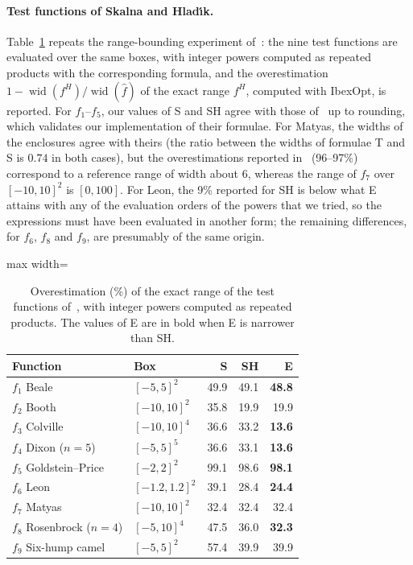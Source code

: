 \documentclass[10pt]{article}
\theoremstyle{definition}
\newcommand{\wid}{\operatorname{wid}}
\begin{document}


\paragraph{Test functions of Skalna and Hlad\'{\i}k.} Table~\ref{tab:sh} repeats the range-bounding experiment of~\cite[Table~3]{skalna2017new}: the nine test functions are evaluated over the same boxes, with integer powers computed as repeated products with the corresponding formula, and the overestimation $1-\wid(f^H)/\wid(\hat f)$ of the exact range $f^H$, computed with IbexOpt, is reported. For $f_1$--$f_5$, our values of S and SH agree with those of~\cite{skalna2017new} up to rounding, which validates our implementation of their formulae. For Matyas, the widths of the enclosures agree with theirs (the ratio between the widths of formulae T and S is $0.74$ in both cases), but the overestimations reported in~\cite{skalna2017new} (96--97\%) correspond to a reference range of width about 6, whereas the range of $f_7$ over $[-10,10]^2$ is $[0,100]$. For Leon, the 9\% reported for SH is below what E attains with any of the evaluation orders of the powers that we tried, so the expressions must have been evaluated in another form; the remaining differences, for $f_6$, $f_8$ and $f_9$, are presumably of the same origin.

\begin{table}[H]
\centering
\caption{Overestimation (\%) of the exact range of the test functions of~\cite{skalna2017new}, with integer powers computed as repeated products. The values of E are in bold when E is narrower than SH.}
\label{tab:sh}
\small
\begin{adjustbox}{max width=\linewidth}\begin{tabular}{llrrr}
\toprule
Function & Box & S & SH & E \\
\midrule
$f_1$ Beale & $[-5,5]^2$ & 49.9 & 49.1 & \textbf{48.8} \\
$f_2$ Booth & $[-10,10]^2$ & 35.8 & 19.9 & 19.9 \\
$f_3$ Colville & $[-10,10]^4$ & 36.6 & 33.2 & \textbf{13.6} \\
$f_4$ Dixon ($n=5$) & $[-5,5]^5$ & 36.6 & 33.1 & \textbf{13.6} \\
$f_5$ Goldstein--Price & $[-2,2]^2$ & 99.1 & 98.6 & \textbf{98.1} \\
$f_6$ Leon & $[-1.2,1.2]^2$ & 39.1 & 28.4 & \textbf{24.4} \\
$f_7$ Matyas & $[-10,10]^2$ & 32.4 & 32.4 & 32.4 \\
$f_8$ Rosenbrock ($n=4$) & $[-5,10]^4$ & 47.5 & 36.0 & \textbf{32.3} \\
$f_9$ Six-hump camel & $[-5,5]^2$ & 57.4 & 39.9 & 39.9 \\
\bottomrule
\end{tabular}\end{adjustbox}
\end{table}
\end{document}
